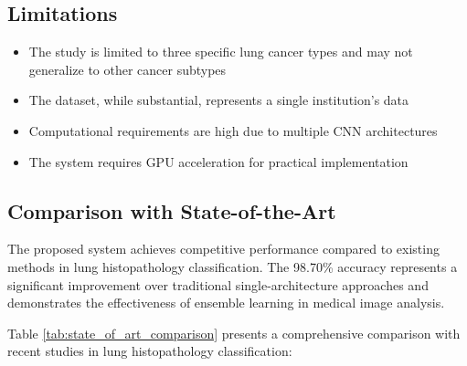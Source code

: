 \documentclass[journal]{IEEEtran}
\begin{document}
\subsection{Limitations}

\begin{itemize}
    \item The study is limited to three specific lung cancer types and may not generalize to other cancer subtypes
    \item The dataset, while substantial, represents a single institution's data
    \item Computational requirements are high due to multiple CNN architectures
    \item The system requires GPU acceleration for practical implementation
\end{itemize}

\subsection{Comparison with State-of-the-Art}

The proposed system achieves competitive performance compared to existing methods in lung histopathology classification. The 98.70\% accuracy represents a significant improvement over traditional single-architecture approaches and demonstrates the effectiveness of ensemble learning in medical image analysis.

Table \ref{tab:state_of_art_comparison} presents a comprehensive comparison with recent studies in lung histopathology classification:

\begin{table}[!t]
\centering
\caption{Comparison with State-of-the-Art Methods}
\label{tab:state_of_art_comparison}
\end{table}
\end{document}
